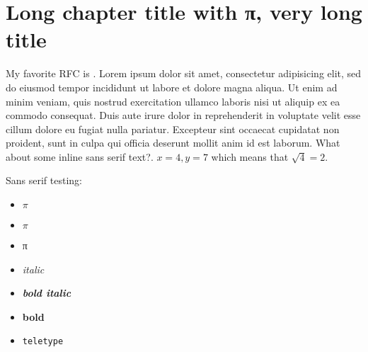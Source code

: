 \chapter{Long chapter title with π, very long title}

My favorite RFC is \cite{rfc2549}.
Lorem ipsum dolor sit amet, consectetur adipisicing elit, sed do eiusmod tempor incididunt ut labore et dolore magna aliqua. Ut enim ad minim veniam, quis nostrud exercitation ullamco laboris nisi ut aliquip ex ea commodo consequat. Duis aute irure dolor in reprehenderit in voluptate velit esse cillum dolore eu fugiat nulla pariatur. Excepteur sint occaecat cupidatat non proident, sunt in culpa qui officia deserunt mollit anim id est laborum. \textsf{What about some inline sans serif text?}. $x = 4, y= 7$ which means that $\sqrt{4} = 2$.

Sans serif testing:
\begin{itemize}
    \item \textsf{$\pi$}
    \item \textsf{$π$}
    \item \textsf{π}
    \item \textsf{\emph{italic}}
    \item \textsf{\textbf{\emph{bold italic}}}
    \item \textsf{\textbf{bold}}
    \item \textsf{\texttt{teletype}}
\end{itemize}

